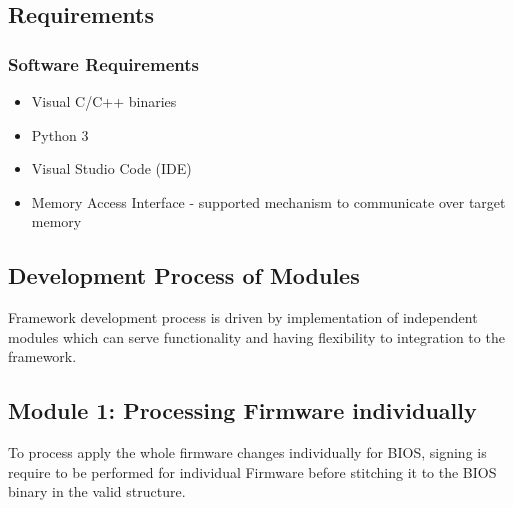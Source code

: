 \subsection{Requirements}
\subsubsection{Software Requirements}
\begin{itemize}
	\item Visual C/C++ binaries
	\item Python 3
	\item Visual Studio Code (IDE)
	\item Memory Access Interface - supported mechanism to communicate over target memory 
\end{itemize}

\subsection{Development Process of Modules}
Framework development process is driven by implementation of independent modules which can serve functionality and having flexibility to integration to the framework.


\subsection{Module 1: Processing Firmware individually}\label{subsection-processing-firmware}
To process apply the whole firmware changes individually for BIOS, signing is require to be performed for individual Firmware before stitching it to the BIOS binary in the valid structure.


